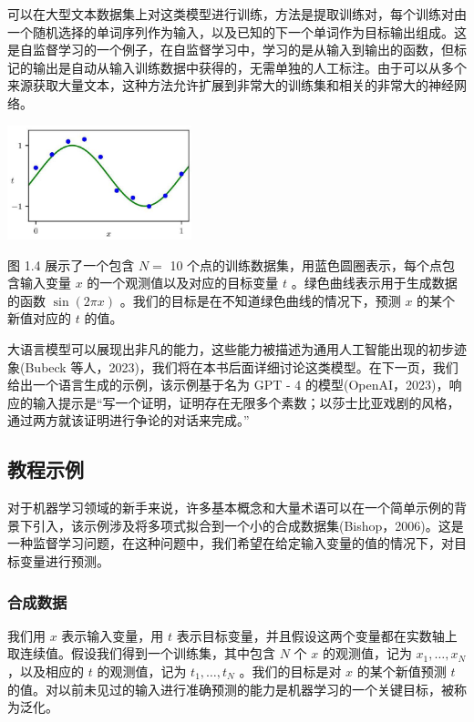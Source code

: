 \documentclass[10pt]{article}
\begin{document}
可以在大型文本数据集上对这类模型进行训练，方法是提取训练对，每个训练对由一个随机选择的单词序列作为输入，以及已知的下一个单词作为目标输出组成。这是自监督学习的一个例子，在自监督学习中，学习的是从输入到输出的函数，但标记的输出是自动从输入训练数据中获得的，无需单独的人工标注。由于可以从多个来源获取大量文本，这种方法允许扩展到非常大的训练集和相关的非常大的神经网络。

\begin{center}
\includegraphics[max width=0.4\textwidth]{images/0194e279-9b28-703a-88f4-c3ac21e2010d_25_946_344_607_378_0.jpg}
\end{center}
\hspace*{3em} 

图 1.4 展示了一个包含 \(N =\) 10 个点的训练数据集，用蓝色圆圈表示，每个点包含输入变量 \(x\) 的一个观测值以及对应的目标变量 \(t\) 。绿色曲线表示用于生成数据的函数 \(\sin \left( {2\pi x}\right)\) 。我们的目标是在不知道绿色曲线的情况下，预测 \(x\) 的某个新值对应的 \(t\) 的值。

大语言模型可以展现出非凡的能力，这些能力被描述为通用人工智能出现的初步迹象(Bubeck 等人，2023)，我们将在本书后面详细讨论这类模型。在下一页，我们给出一个语言生成的示例，该示例基于名为 GPT - 4 的模型(OpenAI，2023)，响应的输入提示是“写一个证明，证明存在无限多个素数；以莎士比亚戏剧的风格，通过两方就该证明进行争论的对话来完成。”


\subsection{教程示例}

对于机器学习领域的新手来说，许多基本概念和大量术语可以在一个简单示例的背景下引入，该示例涉及将多项式拟合到一个小的合成数据集(Bishop，2006)。这是一种监督学习问题，在这种问题中，我们希望在给定输入变量的值的情况下，对目标变量进行预测。

\subsubsection{合成数据}

我们用 \(x\) 表示输入变量，用 \(t\) 表示目标变量，并且假设这两个变量都在实数轴上取连续值。假设我们得到一个训练集，其中包含 \(N\) 个 \(x\) 的观测值，记为 \({x}_{1},\ldots ,{x}_{N}\) ，以及相应的 \(t\) 的观测值，记为 \({t}_{1},\ldots ,{t}_{N}\) 。我们的目标是对 \(x\) 的某个新值预测 \(t\) 的值。对以前未见过的输入进行准确预测的能力是机器学习的一个关键目标，被称为泛化。
\end{document}
